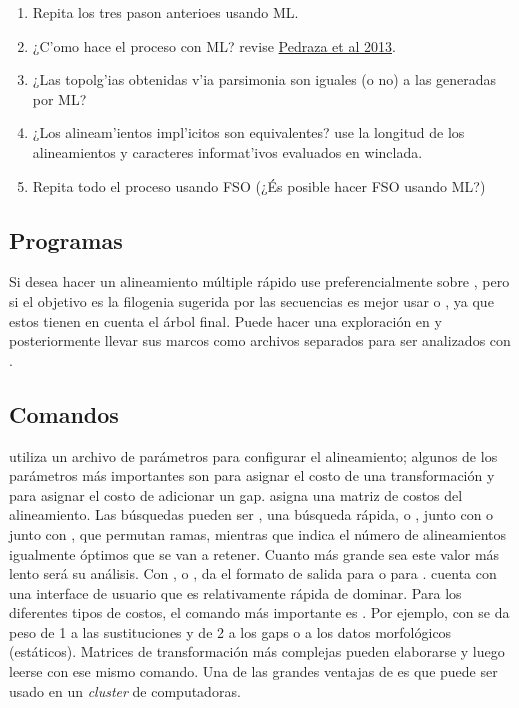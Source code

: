\begin{enumerate}
\item Repita los tres pason anterioes usando ML.

\item ¿C'omo hace el proceso con ML? revise \href{https://www.dropbox.com/s/jz132uakl95d3zh/Pedraza_et_al_2013.pdf}
{Pedraza et al 2013}.


\item ¿Las topolg'ias obtenidas v'ia parsimonia son iguales (o no) a
las generadas por ML?

\item  ¿Los alineam'ientos impl'icitos son equivalentes? use la longitud de los
alineamientos y caracteres informat'ivos evaluados en winclada.

\item  Repita todo el proceso usando FSO (¿És posible hacer FSO usando ML?)

\end{enumerate}

\subsection{Programas}
Si desea hacer un alineamiento m\'ultiple r\'apido use preferencialmente  sobre , pero si el objetivo es la filogenia sugerida por las secuencias es mejor usar  o , ya que estos tienen en cuenta el \'arbol final. Puede hacer una  exploraci\'on en  y posteriormente llevar sus marcos como archivos separados para ser analizados con .

\subsection{Comandos}
 utiliza un archivo de par\'ametros para configurar el alineamiento; algunos de los par\'ametros m\'as 
importantes son  para asignar el costo de una transformaci\'on y  para asignar el costo de 
adicionar un gap.  asigna una matriz de costos del alineamiento. Las b\'usquedas pueden ser , 
una b\'usqueda r\'apida, o , junto con  o junto con , que permutan ramas, 
mientras que  indica el n\'umero de alineamientos igualmente \'optimos que se van a retener. Cuanto m\'as grande sea este valor m\'as lento ser\'a su an\'alisis. Con , o , da el formato de salida para  o 
para .  cuenta con una interface de usuario que es relativamente r\'apida de dominar. Para los diferentes tipos de costos, el comando m\'as importante es . Por ejemplo, con  se da peso de 1 a las sustituciones y de 2 a los gaps o a los datos morfol\'ogicos (est\'aticos). Matrices de transformaci\'on m\'as complejas pueden elaborarse y luego leerse con ese mismo comando. Una de las grandes ventajas de  es que puede ser usado en un \textit{cluster} de computadoras.\\
